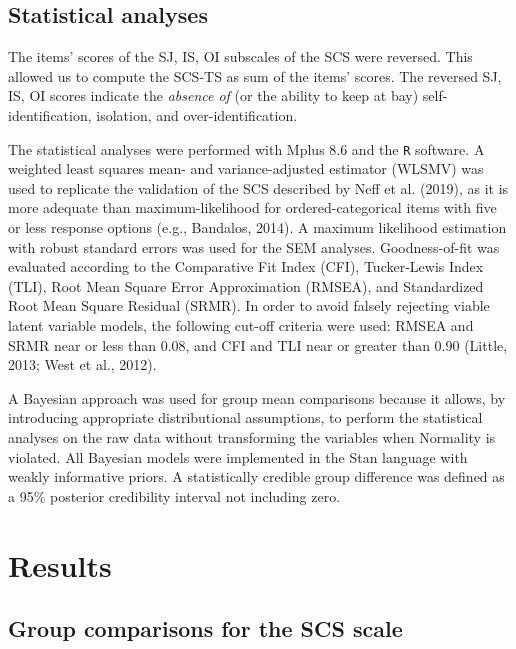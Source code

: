 \documentclass[
  man]{apa7}
\begin{document}
\hypertarget{statistical-analyses}{%
\subsection{Statistical analyses}\label{statistical-analyses}}

The items' scores of the SJ, IS, OI subscales of the SCS were reversed. This allowed us to compute the SCS-TS as sum of the items' scores. The reversed SJ, IS, OI scores indicate the \emph{absence of} (or the ability to keep at bay) self-identification, isolation, and over-identification.

The statistical analyses were performed with Mplus 8.6 and the \texttt{R} software. A weighted least squares mean- and variance-adjusted estimator (WLSMV) was used to replicate the validation of the SCS described by Neff et al. (2019), as it is more adequate than maximum-likelihood for ordered-categorical items with five or less response options (e.g., Bandalos, 2014). A maximum likelihood estimation with robust standard errors was used for the SEM analyses. Goodness-of-fit was evaluated according to the Comparative Fit Index (CFI), Tucker-Lewis Index (TLI), Root Mean Square Error Approximation (RMSEA), and Standardized Root Mean Square Residual (SRMR). In order to avoid falsely rejecting viable latent variable models, the following cut-off criteria were used: RMSEA and SRMR near or less than 0.08, and CFI and TLI near or greater than 0.90 (Little, 2013; West et al., 2012).

A Bayesian approach was used for group mean comparisons because it allows, by introducing appropriate distributional assumptions, to perform the statistical analyses on the raw data without transforming the variables when Normality is violated. All Bayesian models were implemented in the Stan language with weakly informative priors. A statistically credible group difference was defined as a 95\% posterior credibility interval not including zero.

\hypertarget{results}{%
\section{Results}\label{results}}

\hypertarget{group-comparisons-for-the-scs-scale}{%
\subsection{Group comparisons for the SCS scale}\label{group-comparisons-for-the-scs-scale}}
\end{document}
